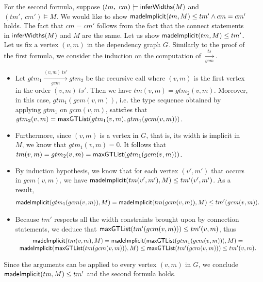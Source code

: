 
For the second formula, suppose $(tm,\ cm) \models {\sf inferWidths}(M)$ and  $(tm',\ cm') \models M$. We would like to show ${\sf madeImplicit}(tm, M) \le tm' \wedge cm = cm'$ holds. The fact that $cm = cm'$ follows from the fact that the connect statements in ${\sf inferWidths}(M)$ and $M$ are the same. 
Let us show ${\sf madeImplicit}(tm, M) \le tm'$. Let us fix a vertex $(v, m)$ in the dependency graph $G$. 
Similarly to the proof of the first formula, we consider the induction on the computation of $\xrightarrow[gcm]{ts}$. 
\begin{itemize}
\item Let $gtm_1 \xrightarrow[gcm]{(v,m)\ ts'} gtm_2$ be the recursive call where $(v, m)$ is the first vertex in the order $(v,m)\ ts'$. Then we have $tm(v, m) = gtm_2(v, m)$. Moreover, in this case, $gtm_1(gcm(v, m))$, i.e. the type sequence obtained by applying $gtm_1$ on $gcm(v, m)$, satisfies that $gtm_2(v, m) = {\sf maxGTList}(gtm_1(v, m), gtm_1(gcm(v, m)))$. 

\item Furthermore, since $(v, m)$ is a vertex in $G$, that is, its width is implicit in $M$, we know that $gtm_1(v, m) = 0$. It follows that $tm(v, m) = gtm_2(v, m) = {\sf maxGTList}(gtm_1(gcm(v, m)))$.  

\item By induction hypothesis, we know that for each vertex $(v', m')$ that occurs in $gcm(v, m)$, we have ${\sf madeImplicit}(tm(v', m'), M) \le tm'(v', m')$. As a result, 
$${\sf madeImplicit}(gtm_1(gcm(v, m)), M) = {\sf madeImplicit}(tm(gcm(v, m)), M) \le tm'(gcm(v, m)).$$ 

\item Because $tm'$ respects all the width constraints brought upon by connection statements, we deduce that ${\sf maxGTList}(tm'(gcm(v, m))) \le tm'(v, m)$, thus 
$$
\begin{array}{c}
{\sf madeImplicit}(tm(v, m), M) = {\sf madeImplicit}({\sf maxGTList}(gtm_1(gcm(v, m))), M) = \\
{\sf madeImplicit}({\sf maxGTList}(tm(gcm(v, m))), M) \le {\sf maxGTList}(tm'(gcm(v, m))) \le tm'(v, m).
\end{array}
$$ 
\end{itemize}
Since the arguments can be applied to every vertex $(v,m)$ in $G$, we conclude ${\sf madeImplicit}(tm, M) \le tm'$ and the second formula holds.  


